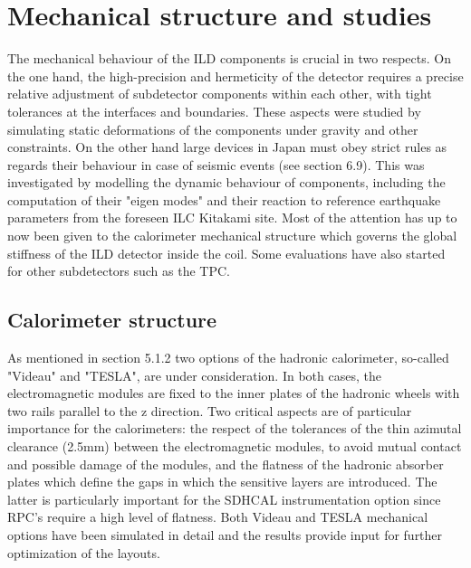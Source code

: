 \section{Mechanical structure and studies}
\label{ild:sec:mechanical_structures}

The mechanical behaviour of the ILD components is crucial in two respects. On the one hand, the high-precision and hermeticity of the detector requires a precise relative adjustment of subdetector components within each other, with tight tolerances at the interfaces and boundaries. These aspects were studied by simulating static deformations of the components under gravity and other constraints. On the other hand large devices in Japan must obey strict rules as regards their behaviour in case of seismic events (see section 6.9). This was investigated by modelling the dynamic behaviour of components, including the computation of their "eigen modes" and their reaction to reference earthquake parameters from the foreseen ILC Kitakami site. Most of the attention has up to now been given to the calorimeter mechanical structure which governs the global stiffness of the ILD detector inside the coil. Some evaluations have also started for other subdetectors such as the TPC.

\subsection{Calorimeter structure}

As mentioned in section 5.1.2 two options of the hadronic calorimeter, so-called "Videau" and "TESLA", are under consideration. In both cases, the electromagnetic modules are fixed to the inner plates of the hadronic wheels with two rails parallel to the z direction. Two critical aspects are of particular importance for the calorimeters: the respect of the tolerances of the thin azimutal clearance (2.5mm) between the electromagnetic modules, to avoid mutual contact and possible damage of the modules, and the flatness of the hadronic absorber plates which define the gaps in which the sensitive layers are introduced. The latter is particularly important for the SDHCAL instrumentation option since RPC's require a high level of flatness. Both Videau and TESLA mechanical options have been simulated in detail and the results provide input for further optimization of the layouts.

